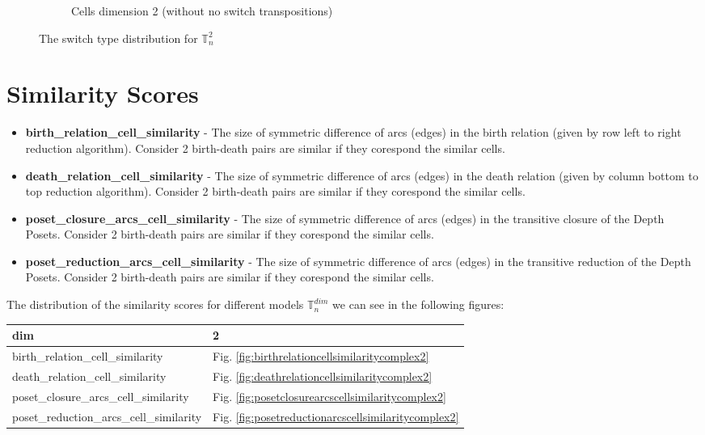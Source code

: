 \documentclass{article}
\begin{document}
\begin{figure}[htbp]
\begin{subfigure}[b]{0.3\textwidth}
    \caption{Cells dimension 2 (without no switch transpositions)}
    \label{fig:complex2cells2onlyswitch}
\end{subfigure}
\caption{The switch type distribution for $\mathbb{T}_n^{2}$}
\label{fig:typesdistribution2}
\end{figure}
\newpage

\section{Similarity Scores}

\begin{itemize}
\item \textbf{birth\_relation\_cell\_similarity} - The size of symmetric difference of arcs (edges) in the birth relation (given by row left to right reduction algorithm).
    Consider 2 birth-death pairs are similar if they corespond the similar cells.
\item \textbf{death\_relation\_cell\_similarity} - The size of symmetric difference of arcs (edges) in the death relation (given by column bottom to top reduction algorithm).
    Consider 2 birth-death pairs are similar if they corespond the similar cells.
\item \textbf{poset\_closure\_arcs\_cell\_similarity} - The size of symmetric difference of arcs (edges) in the transitive closure of the Depth Posets.
    Consider 2 birth-death pairs are similar if they corespond the similar cells.
\item \textbf{poset\_reduction\_arcs\_cell\_similarity} - The size of symmetric difference of arcs (edges) in the transitive reduction of the Depth Posets.
    Consider 2 birth-death pairs are similar if they corespond the similar cells.
\end{itemize}
\par The distribution of the similarity scores for different models $\mathbb{T}^{dim}_n$ we can see in the following figures:
\begin{center}
\begin{tabular}{ll}
\toprule
dim & 2 \\
\midrule
birth\_relation\_cell\_similarity & Fig. \ref{fig:birthrelationcellsimilaritycomplex2} \\
death\_relation\_cell\_similarity & Fig. \ref{fig:deathrelationcellsimilaritycomplex2} \\
poset\_closure\_arcs\_cell\_similarity & Fig. \ref{fig:posetclosurearcscellsimilaritycomplex2} \\
poset\_reduction\_arcs\_cell\_similarity & Fig. \ref{fig:posetreductionarcscellsimilaritycomplex2} \\
\bottomrule
\end{tabular}

\end{center}
\end{document}
